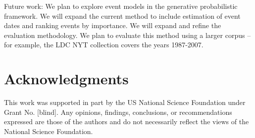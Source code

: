 \documentclass{sig-alternate}
\begin{document}
Future work: We plan to explore event models in the generative probabilistic framework. We will expand the current method to include estimation of event dates and ranking events by importance. We will expand and refine the evaluation methodology. We plan to evaluate this method using a larger corpus -- for example, the LDC NYT collection covers the years 1987-2007.


\section{Acknowledgments}
This work was supported in part by the US National Science Foundation under Grant No. [blind]. Any opinions, findings, conclusions, or recommendations expressed are those of the authors and do not necessarily reflect the views of the National Science Foundation.



  
\end{document}

